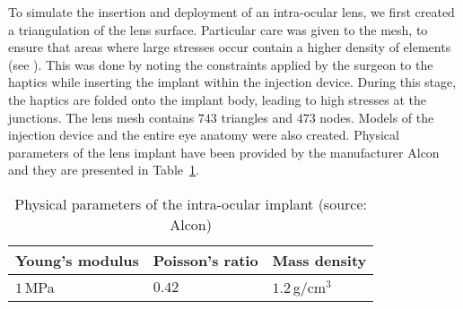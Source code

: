 To simulate the insertion and deployment of an intra-ocular lens, we first created a triangulation of the lens surface. Particular care was given to the mesh, to ensure that areas where large stresses occur contain a higher density of elements (see ). This was done by noting the constraints applied by the surgeon to the haptics while inserting the implant within the injection device. During this stage, the haptics are folded onto the implant body, leading to high stresses at the junctions. The lens mesh contains $743$ triangles and $473$ nodes. Models of the injection device and the entire eye anatomy were also created. Physical parameters of the lens implant have been provided by the manufacturer Alcon and they are presented in Table~\ref{chap9:tab-parameters}.
%
\begin{table}[ht]
	\begin{center}
		\begin{tabular}{|p{3cm}|p{3cm}|p{3cm}|}
		\hline
		 \centering Young's modulus & \centering Poisson's ratio & \centering Mass density \tabularnewline
		\hline
		\centering $1\,$MPa & \centering $0.42$ & \centering $1.2\,$g/cm$^3$ \tabularnewline
		\hline
		\end{tabular}
	\vspace{0.3cm}
	\caption{Physical parameters of the intra-ocular implant (source: Alcon)}
	\label{chap9:tab-parameters}
	\end{center}
\end{table}


